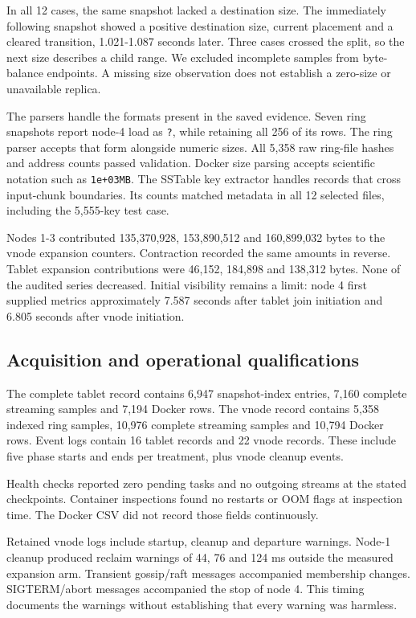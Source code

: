 In all 12 cases, the same snapshot lacked a destination size. The immediately following snapshot showed a positive destination size, current placement and a cleared transition, 1.021-1.087 seconds later. Three cases crossed the split, so the next size describes a child range. We excluded incomplete samples from byte-balance endpoints. A missing size observation does not establish a zero-size or unavailable replica.

The parsers handle the formats present in the saved evidence. Seven ring snapshots report node-4 load as \texttt{?}, while retaining all 256 of its rows. The ring parser accepts that form alongside numeric sizes. All 5,358 raw ring-file hashes and address counts passed validation. Docker size parsing accepts scientific notation such as \texttt{1e+03MB}. The SSTable key extractor handles records that cross input-chunk boundaries. Its counts matched metadata in all 12 selected files, including the 5,555-key test case.

Nodes 1-3 contributed 135,370,928, 153,890,512 and 160,899,032 bytes to the vnode expansion counters. Contraction recorded the same amounts in reverse. Tablet expansion contributions were 46,152, 184,898 and 138,312 bytes. None of the audited series decreased. Initial visibility remains a limit: node 4 first supplied metrics approximately 7.587 seconds after tablet join initiation and 6.805 seconds after vnode initiation.

\hypertarget{acquisition-and-operational-qualifications}{%
\subsection{Acquisition and operational
qualifications}\label{acquisition-and-operational-qualifications}}

The complete tablet record contains 6,947 snapshot-index entries, 7,160 complete streaming samples and 7,194 Docker rows. The vnode record contains 5,358 indexed ring samples, 10,976 complete streaming samples and 10,794 Docker rows. Event logs contain 16 tablet records and 22 vnode records. These include five phase starts and ends per treatment, plus vnode cleanup events.

Health checks reported zero pending tasks and no outgoing streams at the stated checkpoints. Container inspections found no restarts or OOM flags at inspection time. The Docker CSV did not record those fields continuously.

Retained vnode logs include startup, cleanup and departure warnings. Node-1 cleanup produced reclaim warnings of 44, 76 and 124 ms outside the measured expansion arm. Transient gossip/raft messages accompanied membership changes. SIGTERM/abort messages accompanied the stop of node 4. This timing documents the warnings without establishing that every warning was harmless.

